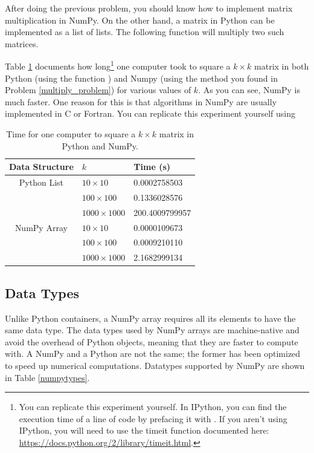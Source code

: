 After doing the previous problem, you should know how to implement matrix multiplication in NumPy. On the other hand, a matrix in Python can be implemented as a list of lists. The following function will multiply two such matrices.



Table \ref{square_times} documents how long\footnote{You can replicate this experiment yourself. In IPython, you can find the execution time of a line of code by prefacing it with . If you aren't using IPython, you will need
to use the timeit function documented here: \url{https://docs.python.org/2/library/timeit.html}.} one computer took to square a $k \times k$ matrix in both Python (using the function ) and Numpy (using the method you found in Problem \ref{multiply_problem}) for various values of $k$. As you can see, NumPy is much faster. One reason for this is that algorithms in NumPy are usually implemented in C or Fortran. You can replicate this experiment yourself using

\begin{table}[ht]
 \begin{tabular}{|c|l|l|} \hline Data Structure & $k$ & Time (s) \\ \hline 
 Python List  	& $10\times10$ 	& 0.0002758503 \\ 
 \cline{2-3} 	& $100\times100$ 	& 0.1336028576 \\ 
 \cline{2-3} 	& $1000\times1000$ & 200.4009799957 \\ 
\hline \hline 
 NumPy Array 	& $10\times10$ 	& 0.0000109673 \\
 \cline{2-3} 	& $100\times100$ 	& 0.0009210110 \\ 
 \cline{2-3} 	& $1000\times1000$ & 2.1682999134 \\
 \hline \end{tabular}
 \caption{Time for one computer to square a $k \times k$ matrix in Python and NumPy.}
\label{square_times} 
\end{table}
 
 
% 



\subsection*{Data Types}
Unlike Python containers, a NumPy array requires all its elements to have the same data type. The data types used by NumPy arrays are machine-native and avoid the overhead of Python objects, meaning that they are faster to compute with. A NumPy  and a Python  are not the same; the former has been optimized to speed up numerical computations. Datatypes supported by NumPy are shown in Table \ref{numpytypes}.


